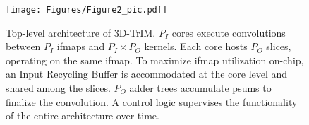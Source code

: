 \begin{figure}
\texttt{[image: Figures/Figure2\_pic.pdf]}
\centering
\caption{Top-level architecture of 3D-TrIM. $P_I$ cores execute convolutions between $P_I$ ifmaps and $P_I \times P_O$ kernels. Each core hosts $P_O$ slices, operating on the same ifmap. To maximize ifmap utilization on-chip, an Input Recycling Buffer is accommodated at the core level and shared among the slices. $P_O$ adder trees accumulate psums to finalize the convolution. A control logic supervises the functionality of the entire architecture over time.
}
\label{3D_SA_TOP}
\end{figure}